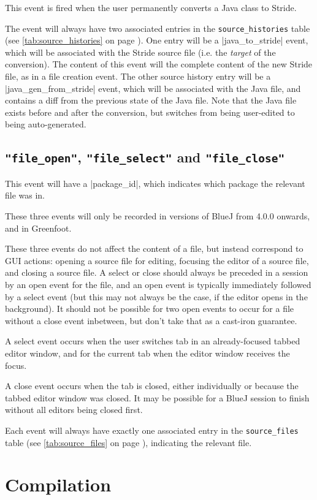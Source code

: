 \documentclass{report}
\newcommand{\myref}[1]{\autoref{#1} on page \pageref*{#1}}
\newcommand{\tabref}[1]{\lstinline|#1| table (see \myref{tab:#1})}
\begin{document}
This event is fired when the user permanently converts a Java class to Stride.

The event will always have two associated entries in the
\tabref{source_histories}.  One entry will be a |java_to_stride| event, which will
be associated with the Stride source file (i.e. the \textit{target} of the conversion).  The content
  of this event will the complete content of the new Stride file, as in a file creation event.
The other source history entry will be a |java_gen_from_stride| event, which will be associated with the Java file, and contains a diff from the previous state of the Java file.  Note that the Java file exists before and after the conversion, but switches from being user-edited to being auto-generated.

\subsection{\lstinline!"file_open"!, \lstinline!"file_select"! and \lstinline!"file_close"!}

This event will have a |package_id|, which indicates which package the relevant file
was in.

These three events will only be recorded in versions of BlueJ from 4.0.0 onwards, and
in Greenfoot.

These three events do not affect the content of a file, but instead correspond to
GUI actions: opening a source file for editing, focusing the editor of a source file, and
closing a source file.  A select or close should always be preceded in a session by an
open event for the file, and an open event is typically immediately followed by a
select event (but this may not always be the case, if the editor opens in the background).
It should not be possible for two open events to occur for a file without a close event
inbetween, but don't take that as a cast-iron guarantee.

A select event occurs when the user switches tab in an already-focused tabbed editor window,
and for the current tab when the editor window receives the focus.

A close event occurs when the tab is closed, either individually or because the tabbed editor
window was closed.  It may be possible for a BlueJ session to finish without all editors being
closed first.

Each event will always have exactly one associated entry in the \tabref{source_files},
indicating the relevant file.

\section{Compilation}
\end{document}
